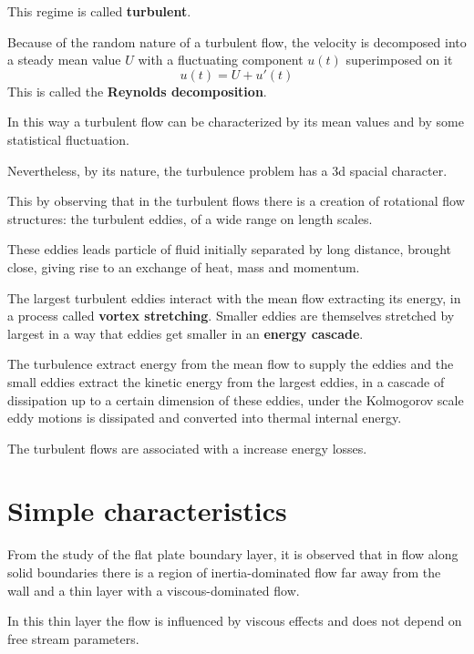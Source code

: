 \documentclass[a4paper, 15pt]{article}
\begin{document}
This regime is called \textbf{turbulent}. \newline 

Because of the random nature of a turbulent flow, the velocity is decomposed into a steady mean value $U$ with a
fluctuating component $u(t)$ superimposed on it
\[ u(t) = U + u'(t)\]
This is called the \textbf{Reynolds decomposition}. 

In this way a turbulent flow can be characterized by its mean values and by some statistical fluctuation.  \newline

Nevertheless, by its nature, the turbulence problem has a 3d spacial character. 

This by observing that in the turbulent flows there is a creation of rotational flow structures: the turbulent eddies, of a wide range on length scales.\newline 

These eddies leads particle of fluid initially separated by long distance, brought close, giving rise to an exchange of heat, mass and momentum. 

The largest turbulent eddies interact with the mean flow extracting its energy, in a process called \textbf{vortex stretching}. Smaller eddies are themselves stretched by largest in a way that eddies get smaller in an \textbf{energy cascade}. \newline 

The turbulence extract energy from the mean flow to supply the eddies and the small eddies extract the kinetic energy from the largest eddies, in a cascade of dissipation up to a certain dimension of these eddies, under the Kolmogorov scale eddy motions is dissipated and converted into thermal internal
energy. \newline 

The turbulent flows are associated with a increase energy losses.  


\newpage
\section{Simple characteristics}

	From the study of the flat plate boundary layer, it is observed that in flow along solid boundaries there is a region of inertia-dominated flow far away from the wall and a thin layer with a viscous-dominated flow. 
	
	In this thin layer the flow is influenced by viscous effects and does not depend on free stream
	parameters. 
	
\end{document}
